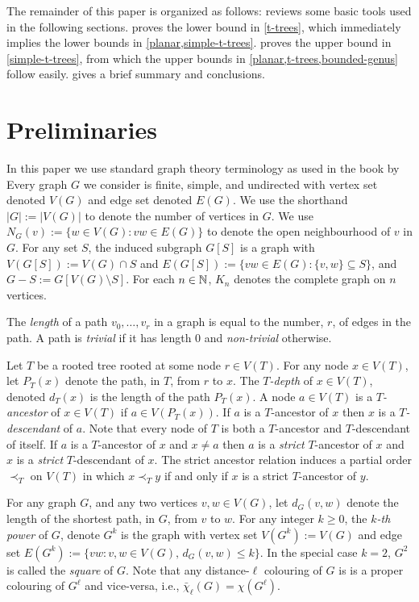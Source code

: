 \documentclass[kpfonts]{patmorin}
\newcommand{\dlcn}{\bar{\chi}_\ell}
\theoremstyle{named}
\begin{document}
The remainder of this paper is organized as follows:  reviews some basic tools used in the following sections.    proves the lower bound in \cref{t-trees}, which immediately implies the lower bounds in \cref{planar,simple-t-trees}.  proves the upper bound in \cref{simple-t-trees}, from which the upper bounds in \cref{planar,t-trees,bounded-genus} follow easily.   gives a brief summary and conclusions.

\section{Preliminaries}

In this paper we use standard graph theory terminology as used in the book by \citet{diestel:graph}
Every graph $G$ we consider is finite, simple, and undirected with vertex set denoted $V(G)$ and edge set denoted $E(G)$.  We use the shorthand $|G|:=|V(G)|$ to denote the number of vertices in $G$.  We use $N_G(v):=\{w\in V(G): vw\in E(G)\}$ to denote the open neighbourhood of $v$ in $G$.  For any set $S$, the induced subgraph  $G[S]$ is a graph with $V(G[S]):=V(G)\cap S$ and $E(G[S]):=\{vw\in E(G): \{v,w\}\subseteq S\}$, and $G-S:=G[V(G)\setminus S]$. For each $n\in\mathbb{N}$, $K_n$ denotes the complete graph on $n$ vertices.

The \emph{length} of a path $v_0,\ldots,v_r$ in a graph is equal to the number, $r$, of edges in the path. A path is \emph{trivial} if it has length 0 and \emph{non-trivial} otherwise.

Let $T$ be a rooted tree rooted at some node $r\in V(T)$.  For any node $x\in V(T)$, let $P_T(x)$ denote the path, in $T$, from $r$ to $x$.  The \emph{$T$-depth} of $x\in V(T)$, denoted $d_T(x)$ is the length of the path $P_T(x)$.  A node $a\in V(T)$ is a \emph{$T$-ancestor} of $x\in V(T)$ if $a\in V(P_T(x))$. If $a$ is a $T$-ancestor of $x$ then $x$ is a \emph{$T$-descendant} of $a$.  Note that every node of $T$ is both a $T$-ancestor and $T$-descendant of itself.  If $a$ is a $T$-ancestor of $x$ and $x\neq a$ then $a$ is a \emph{strict} $T$-ancestor of $x$ and $x$ is a \emph{strict} $T$-descendant of $x$.  The strict ancestor relation induces a partial order $\prec_T$ on $V(T)$ in which $x\prec_T y$ if and only if $x$ is a strict $T$-ancestor of $y$.

For any graph $G$, and any two vertices $v,w\in V(G)$, let $d_G(v,w)$ denote the length of the shortest path, in $G$, from $v$ to $w$. For any integer $k\ge 0$, the \emph{$k$-th power} of $G$, denote $G^k$ is the graph with vertex set $V(G^k):=V(G)$ and edge set $E(G^{k}):=\{vw:v,w\in V(G),\,d_G(v,w)\le k\}$. In the special case $k=2$, $G^2$ is called the \emph{square} of $G$.  Note that any distance-$\ell$ colouring of $G$ is is a proper colouring of $G^\ell$ and vice-versa, i.e., $\dlcn(G)=\chi(G^\ell)$.
\end{document}
